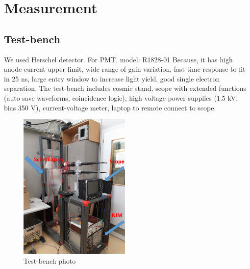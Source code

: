 \section{Measurement}
\label{sec:Measurement}


\subsection{Test-bench}
We used Herschel detector.
For PMT, model: R1828-01
Because, it has high anode current upper limit, wide range of gain variation, fast time response to fit in 25 ns, large entry window to increase light yield, good single electron separation.
The test-bench includes cosmic stand, scope with extended functions (auto save waveforms, coincidence logic), high voltage power supplies (1.5 kV, bias 350 V), current-voltage meter, laptop to remote connect to scope.

\begin{figure}[h]
\centering
    \includegraphics[width=5.5cm]{figs/INT/Tools.png} 
\caption{ 
    Test-bench photo
}
\end{figure}

